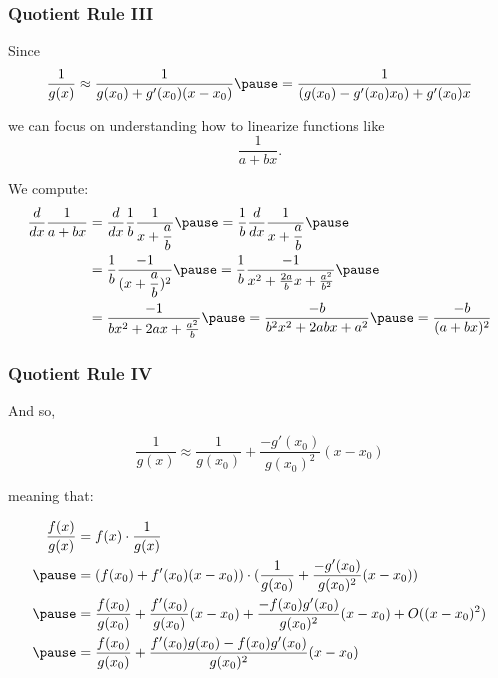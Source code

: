 \documentclass{ltx-talk}
\begin{document}
\begin{frame}
  \frametitle{Quotient Rule III}
  Since
  \begin{equation}
    \dfrac{1}{g(x)} \approx \dfrac{1}{g(x_0) + g'(x_0)(x - x_0)} \pause = \dfrac{1}{(g(x_0) - g'(x_0)x_0) + g'(x_0)x}
  \end{equation} \pause

  we can focus on understanding how to linearize functions like
  \begin{equation}
    \dfrac{1}{a + bx}.
  \end{equation}

  We compute: \pause
  \begin{align}
    \dfrac{d}{dx} \dfrac{1}{a + bx} &= \dfrac{d}{dx} \dfrac{1}{b} \dfrac{1}{x + \dfrac{a}{b}}  \pause
                                    = \dfrac{1}{b} \dfrac{d}{dx} \dfrac{1}{x + \dfrac{a}{b}} \pause \\
                                    &= \dfrac{1}{b} \dfrac{-1}{(x + \dfrac{a}{b})^2}  \pause
                                    = \dfrac{1}{b} \dfrac{-1}{x^2 + \frac{2a}{b}x + \frac{a^2}{b^2}} \pause \\
                                    &= \dfrac{-1}{bx^2 + 2a x + \frac{a^2}{b}}  \pause
                                    = \dfrac{-b}{b^2x^2 + 2abx + a^2}  \pause
                                    = \dfrac{-b}{(a + bx)^2}
  \end{align} \pause
\end{frame}

\begin{frame}
  \frametitle{Quotient Rule IV}
  And so,

  \begin{equation}
    \dfrac{1}{g(x)} \approx \dfrac{1}{g(x_0)} + \dfrac{-g'(x_0)}{g(x_0)^2} (x - x_0)
  \end{equation} \pause

  meaning that: \pause

  \begin{align}
    \dfrac{f(x)}{g(x)} &= f(x) \cdot \dfrac{1}{g(x)} \\ \pause
                       &= (f(x_0) + f'(x_0)(x - x_0)) \cdot (\dfrac{1}{g(x_0)} + \dfrac{-g'(x_0)}{g(x_0)^2} (x - x_0)) \\ \pause
                       &= \dfrac{f(x_0)}{g(x_0)} + \dfrac{f'(x_0)}{g(x_0)}(x-x_0) + \dfrac{-f(x_0)g'(x_0)}{g(x_0)^2}(x - x_0) + O((x - x_0)^2) \\ \pause
                       &= \dfrac{f(x_0)}{g(x_0)} + \dfrac{f'(x_0) g(x_0) - f(x_0) g'(x_0)}{g(x_0)^2}(x - x_0)
  \end{align}
\end{frame}
\end{document}
